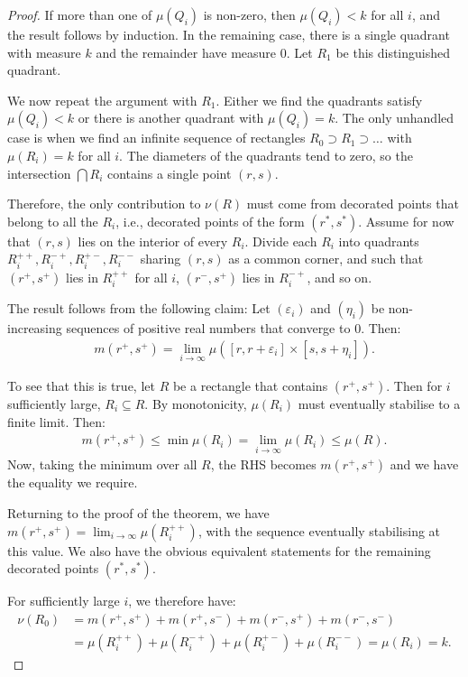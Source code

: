 \begin{proof}
If more than one of $\mu(Q_i)$ is non-zero, then $\mu(Q_i) < k$ for all $i$, and the result follows by induction. In the remaining case, there is a single quadrant with measure $k$ and the remainder have measure $0$. Let $R_1$ be this distinguished quadrant.

We now repeat the argument with $R_1$. Either we find the quadrants satisfy $\mu(Q_i) < k$ or there is another quadrant with $\mu(Q_i) = k$. The only unhandled case is when we find an infinite sequence of rectangles $R_0 \supset R_1 \supset \dots$ with $\mu(R_i) = k$ for all $i$. The diameters of the quadrants tend to zero, so the intersection $\bigcap R_i$ contains a single point $(r, s)$.

Therefore, the only contribution to $\nu(R)$ must come from decorated points that belong to all the $R_i$, i.e., decorated points of the form $(r^*, s^*)$. Assume for now that $(r, s)$ lies on the interior of every $R_i$. Divide each $R_i$ into quadrants $R_i^{++}, R_i^{-+}, R_i^{+-}, R_i^{--}$ sharing $(r, s)$ as a common corner, and such that $(r^+, s^+)$ lies in $R_i^{++}$ for all $i$, $(r^-, s^+)$ lies in $R_i^{-+}$, and so on.

The result follows from the following claim: Let $(\varepsilon_i)$ and $(\eta_i)$ be non-increasing sequences of positive real numbers that converge to $0$. Then:
\begin{align*}
m(r^+, s^+) = \lim_{i\to\infty} \mu([r, r+\varepsilon_i] \times [s, s+\eta_i]).
\end{align*}

To see that this is true, let $R$ be a rectangle that contains $(r^+, s^+)$. Then for $i$ sufficiently large, $R_i \subseteq R$. By monotonicity, $\mu(R_i)$ must eventually stabilise to a finite limit. Then:
\begin{align*}
m(r^+, s^+) \leq \min \mu(R_i) = \lim_{i \to \infty} \mu(R_i) \leq \mu(R).
\end{align*}
Now, taking the minimum over all $R$, the RHS becomes $m(r^+, s^+)$ and we have the equality we require.

Returning to the proof of the theorem, we have $m(r^+, s^+) = \lim_{i\to\infty} \mu(R_i^{++})$, with the sequence eventually stabilising at this value. We also have the obvious equivalent statements for the remaining decorated points $(r^*, s^*)$. 

For sufficiently large $i$, we therefore have:
\begin{align*}
\nu(R_0) &= m(r^+, s^+) + m(r^+, s^-) + m(r^-, s^+) + m(r^-, s^-) \\
&= \mu(R_i^{++}) + \mu(R_i^{-+}) + \mu(R_i^{+-}) + \mu(R_i^{--}) = \mu(R_i) = k.
\end{align*}


\end{proof}
